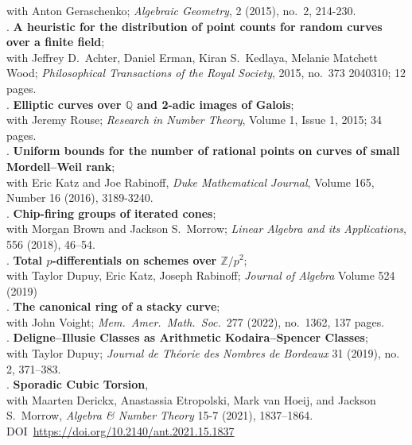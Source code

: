 \documentclass[margin,line]{res}
\newcounter{pubs}
\begin{document}
\begin{resume}
with Anton Geraschenko; \emph{Algebraic Geometry}, 2 (2015), no.~2, 214-230. \medskip\\
 . \textbf{A heuristic for the distribution of point counts for random   curves over a finite field};\\
with Jeffrey D.~Achter, Daniel Erman, Kiran S.~Kedlaya, Melanie Matchett Wood; \emph{Philosophical Transactions of the Royal Society}, 2015, no.~373 2040310; 12 pages. \medskip\\
 . \textbf{Elliptic curves over $\mathbb{Q}$ and 2-adic images of Galois};\\
with Jeremy Rouse;  \emph{Research in Number Theory}, Volume 1, Issue 1, 2015; 34 pages. \medskip\\
 . \textbf{Uniform bounds for the number of rational points on curves of small Mordell--Weil rank};\\
with Eric Katz and Joe Rabinoff, \emph{Duke Mathematical Journal}, Volume 165, Number 16 (2016), 3189-3240. \medskip\\
 .  \textbf{Chip-firing groups of iterated cones};\\
with Morgan Brown and Jackson S.~Morrow; \emph{Linear Algebra and its Applications}, 556 (2018), 46--54. \medskip\\
 .  \textbf{Total $p$-differentials on schemes over $\mathbb{Z}/p^2$};\\
with Taylor Dupuy, Eric Katz, Joseph Rabinoff; \emph{Journal of Algebra} Volume 524 (2019) \medskip\\
 .  \textbf{The canonical ring of a stacky curve};\\
with John Voight; \emph{Mem.~Amer.~Math.~Soc.}~277 (2022), no.~1362, 137 pages. \medskip\\
 .  \textbf{Deligne--Illusie Classes as Arithmetic Kodaira--Spencer Classes};\\
with Taylor Dupuy; \emph{Journal de Th\'eorie des Nombres de Bordeaux} 31 (2019), no. 2, 371--383. \medskip\\
 .  \textbf{Sporadic Cubic Torsion},\\
with Maarten Derickx, Anastassia Etropolski, Mark van Hoeij, and Jackson S.~Morrow, \emph{Algebra \& Number Theory} 15-7 (2021), 1837--1864. DOI~\url{https://doi.org/10.2140/ant.2021.15.1837}
\medskip\\

\end{resume}
\end{document}
